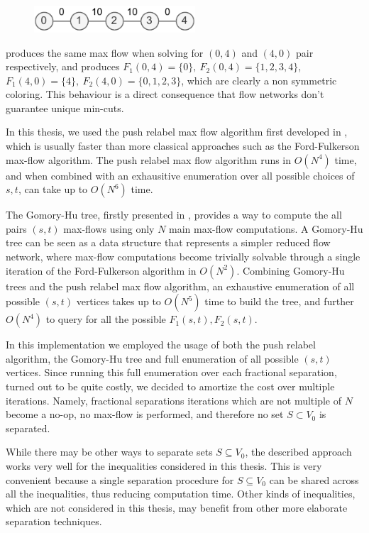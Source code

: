 \begin{figure}[H]
	\centering
	\includegraphics[width=6cm]{Imgs/single-path-flow-network.pdf}
\end{figure}

produces the same max flow when solving for $(0, 4)$ and $(4, 0)$ pair respectively, and produces $F_1(0, 4) = \{ 0\},\ F_2(0, 4) = \{ 1, 2, 3, 4\}$, $F_1(4, 0) = \{ 4 \},\ F_2(4, 0) = \{ 0, 1, 2, 3\}$, which are clearly a non symmetric coloring.
This behaviour is a direct consequence that flow networks don't guarantee unique min-cuts.

In this thesis, we used the push relabel max flow algorithm first developed in \cite{goldberg_efficient_1997}, which is usually faster than more classical approaches such as the Ford-Fulkerson max-flow algorithm.
The push relabel max flow algorithm runs in $O(N^4)$ time, and when combined with an exhausitive enumeration over all possible choices of $s, t$, can take up to $O(N^6)$ time.

The Gomory-Hu tree, firstly presented in \cite{gomory_multi-terminal_1961}, provides a way to compute the all pairs $(s, t)$ max-flows using only $N$ main max-flow computations.
A Gomory-Hu tree can be seen as a data structure that represents a simpler reduced flow network, where max-flow computations become trivially solvable through a single iteration of the Ford-Fulkerson algorithm in $O(N^2)$.
Combining Gomory-Hu trees and the push relabel max flow algorithm, an exhaustive enumeration of all possible $(s, t)$ vertices takes up to $O(N^5)$ time to build the tree, and further $O(N^4)$ to query for all the possible $F_1(s, t), F_2(s, t)$.

In this implementation we employed the usage of both the push relabel algorithm, the Gomory-Hu tree and full enumeration of all possible $(s, t)$ vertices.
Since running this full enumeration over each fractional separation, turned out to be quite costly, we decided to amortize the cost over multiple iterations.
Namely, fractional separations iterations which are not multiple of $N$ become a no-op, no max-flow is performed, and therefore no set $S \subset V_0$ is separated.

While there may be other ways to separate sets $S \subseteq V_0$, the described approach works very well for the inequalities considered in this thesis.
This is very convenient because a single separation procedure for $S \subseteq V_0$ can be shared across all the inequalities, thus reducing computation time.
Other kinds of inequalities, which are not considered in this thesis, may benefit from other more elaborate separation techniques.

